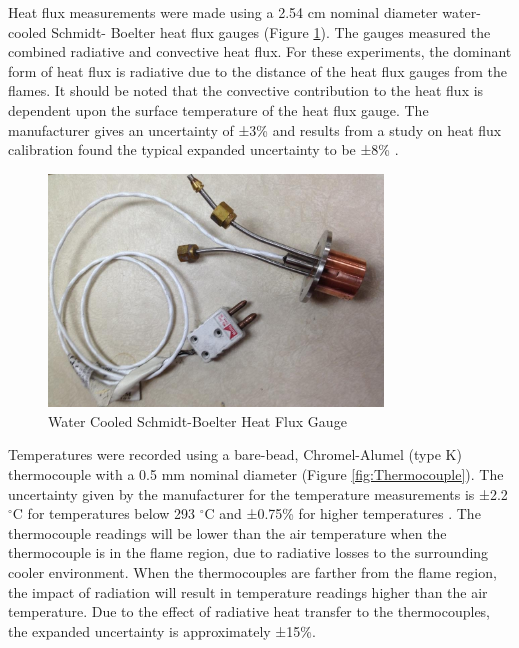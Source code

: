 \documentclass{article}
\begin{document}
Heat flux measurements were made using a 2.54 cm nominal diameter water-cooled Schmidt- Boelter heat flux gauges (Figure \ref{fig:HeatFluxGauge}). The gauges measured the combined radiative and convective heat flux. For these experiments, the dominant form of heat flux is radiative due to the distance of the heat flux gauges from the flames. It should be noted that the convective contribution to the heat flux is dependent upon the surface temperature of the heat flux gauge. The manufacturer gives an uncertainty of ±3\% and results from a study on heat flux calibration found the typical expanded uncertainty to be ±8\% \cite{HeatFluxRoundRobin}.

\begin{figure} [H]
	\centering
	\includegraphics[width = 3.5in]{0_Images/Instrumentation/Heat_Flux_Gauge.jpg}
	\caption{Water Cooled Schmidt-Boelter Heat Flux Gauge}
	\label{fig:HeatFluxGauge}
\end{figure}

Temperatures were recorded using a bare-bead, Chromel-Alumel (type K) thermocouple with a 0.5 mm nominal diameter (Figure \ref{fig:Thermocouple}). The uncertainty given by the manufacturer for the temperature measurements is ±2.2 $^{\circ}$C for temperatures below 293 $^{\circ}$C and ±0.75\% for higher temperatures \cite{TemperatureHandbook}. The thermocouple readings will be lower than the air temperature when the thermocouple is in the flame region, due to radiative losses to the surrounding cooler environment. When the thermocouples are farther from the flame region, the impact of radiation will result in temperature readings higher than the air temperature. Due to the effect of radiative heat transfer to the thermocouples, the expanded uncertainty is approximately ±15\%.
\end{document}
